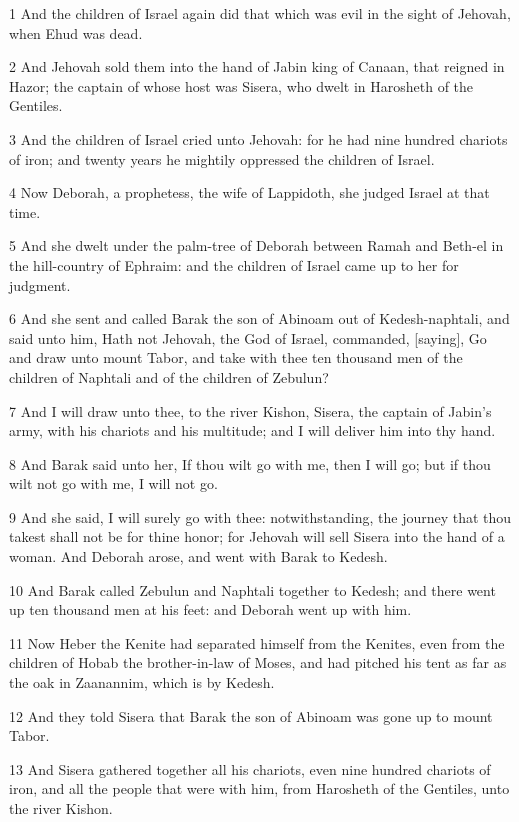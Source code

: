 \par 1 And the children of Israel again did that which was evil in the sight of Jehovah, when Ehud was dead.
\par 2 And Jehovah sold them into the hand of Jabin king of Canaan, that reigned in Hazor; the captain of whose host was Sisera, who dwelt in Harosheth of the Gentiles.
\par 3 And the children of Israel cried unto Jehovah: for he had nine hundred chariots of iron; and twenty years he mightily oppressed the children of Israel.
\par 4 Now Deborah, a prophetess, the wife of Lappidoth, she judged Israel at that time.
\par 5 And she dwelt under the palm-tree of Deborah between Ramah and Beth-el in the hill-country of Ephraim: and the children of Israel came up to her for judgment.
\par 6 And she sent and called Barak the son of Abinoam out of Kedesh-naphtali, and said unto him, Hath not Jehovah, the God of Israel, commanded, [saying], Go and draw unto mount Tabor, and take with thee ten thousand men of the children of Naphtali and of the children of Zebulun?
\par 7 And I will draw unto thee, to the river Kishon, Sisera, the captain of Jabin's army, with his chariots and his multitude; and I will deliver him into thy hand.
\par 8 And Barak said unto her, If thou wilt go with me, then I will go; but if thou wilt not go with me, I will not go.
\par 9 And she said, I will surely go with thee: notwithstanding, the journey that thou takest shall not be for thine honor; for Jehovah will sell Sisera into the hand of a woman. And Deborah arose, and went with Barak to Kedesh.
\par 10 And Barak called Zebulun and Naphtali together to Kedesh; and there went up ten thousand men at his feet: and Deborah went up with him.
\par 11 Now Heber the Kenite had separated himself from the Kenites, even from the children of Hobab the brother-in-law of Moses, and had pitched his tent as far as the oak in Zaanannim, which is by Kedesh.
\par 12 And they told Sisera that Barak the son of Abinoam was gone up to mount Tabor.
\par 13 And Sisera gathered together all his chariots, even nine hundred chariots of iron, and all the people that were with him, from Harosheth of the Gentiles, unto the river Kishon.
